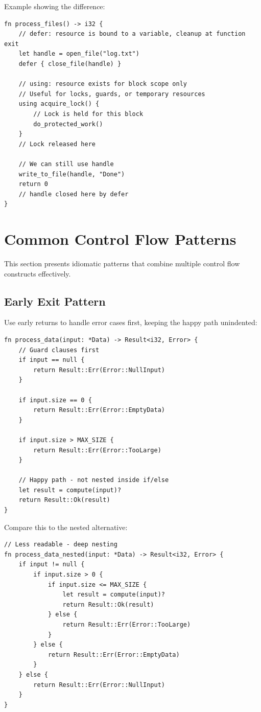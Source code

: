 Example showing the difference:

\begin{lstlisting}
fn process_files() -> i32 {
    // defer: resource is bound to a variable, cleanup at function exit
    let handle = open_file("log.txt")
    defer { close_file(handle) }

    // using: resource exists for block scope only
    // Useful for locks, guards, or temporary resources
    using acquire_lock() {
        // Lock is held for this block
        do_protected_work()
    }
    // Lock released here

    // We can still use handle
    write_to_file(handle, "Done")
    return 0
    // handle closed here by defer
}
\end{lstlisting}

\section{Common Control Flow Patterns}
\label{sec:control-flow-patterns}

This section presents idiomatic patterns that combine multiple control flow constructs effectively.

\subsection{Early Exit Pattern}

Use early returns to handle error cases first, keeping the happy path unindented:

\begin{lstlisting}
fn process_data(input: *Data) -> Result<i32, Error> {
    // Guard clauses first
    if input == null {
        return Result::Err(Error::NullInput)
    }

    if input.size == 0 {
        return Result::Err(Error::EmptyData)
    }

    if input.size > MAX_SIZE {
        return Result::Err(Error::TooLarge)
    }

    // Happy path - not nested inside if/else
    let result = compute(input)?
    return Result::Ok(result)
}
\end{lstlisting}

Compare this to the nested alternative:

\begin{lstlisting}
// Less readable - deep nesting
fn process_data_nested(input: *Data) -> Result<i32, Error> {
    if input != null {
        if input.size > 0 {
            if input.size <= MAX_SIZE {
                let result = compute(input)?
                return Result::Ok(result)
            } else {
                return Result::Err(Error::TooLarge)
            }
        } else {
            return Result::Err(Error::EmptyData)
        }
    } else {
        return Result::Err(Error::NullInput)
    }
}
\end{lstlisting}

